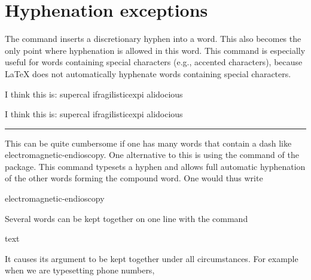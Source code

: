 \hfill\hfill{\hbox{\small}


\section{Hyphenation exceptions}

The command \cs{-}  inserts a discretionary hyphen into a word. This also becomes the only point where hyphenation is allowed in this word. This command is especially useful for words containing special characters (e.g., accented characters), because LaTeX does not automatically hyphenate words containing special characters.

\begin{teX}
\begin{minipage}{2in}
I think this is: su\-per\-cal\-%
i\-frag\-i\-lis\-tic\-ex\-pi\-%
al\-i\-do\-cious
\end{minipage}
\end{teX}
\bigskip



\noindent{\color{orange}\rule{5cm}{1pt}\hfill\hfill\par}
\begin{center}
\par
\begin{minipage}{2in}
I think this is: su\-per\-cal\-%
i\-frag\-i\-lis\-tic\-ex\-pi\-%
al\-i\-do\-cious
\par
\end{minipage}
\end{center}
{\hfill\hfill\color{orange}\rule{5cm}{1pt}\par}
\hfill\hfill{\hbox{\small}
\bigskip

This can be quite cumbersome if one has many words that contain a dash like electromagnetic-endioscopy. One alternative to this is using the  command of the  package. This command typesets a hyphen and allows full automatic hyphenation of the other words forming the compound word. One would thus write

\begin{teX}
electromagnetic\hyp{}endioscopy
\end{teX}


Several words can be kept together on one line with the command

\begin{teX}
\mbox{text}
\end{teX}

It causes its argument to be kept together under all circumstances. 
For example when we are typesetting phone numbers,

}}
